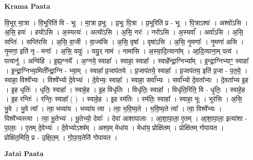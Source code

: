 \documentclass[17pt]{extarticle}
\begin{document}
\textbf{Krama Paata} \newline

वि॒भूर् मा॒त्रा । वि॒भूरिति॑ वि - भूः । मा॒त्रा प्र॒भूः । प्र॒भूः पि॒त्रा । प्र॒भूरिति॑ प्र - भूः । पि॒त्राऽश्वः॑ । अश्वो॑ऽसि । अ॒सि॒ हयः॑ । हयो॑ऽसि । अ॒स्यत्यः॑ । अत्यो॑ऽसि । अ॒सि॒ नरः॑ । नरो॑ऽसि । अ॒स्यर्वा᳚ । अर्वा॑ऽसि । अ॒सि॒ सप्तिः॑ । सप्ति॑रसि । अ॒सि॒ वा॒जी । वा॒ज्य॑सि । अ॒सि॒ वृषा᳚ । वृषा॑ऽसि । अ॒सि॒ नृ॒मणाः᳚ । नृ॒मणा॑ असि । नृ॒मणा॒ इति॑ नृ - मनाः᳚ । अ॒सि॒ ययुः॑ । ययु॒र् नाम॑ । नामा॑सि । अ॒स्या॒दि॒त्याना᳚म् । आ॒दि॒त्याना॒म् पत्व॑ । पत्वानु॑ । अन्वि॑हि । इ॒ह्य॒ग्नये᳚ । अ॒ग्नये॒ स्वाहा᳚ । स्वाहा॒ स्वाहा᳚ । स्वाहे᳚न्द्रा॒ग्निभ्या᳚म् । इ॒न्द्रा॒ग्निभ्याꣳ॒॒ स्वाहा᳚ । इ॒न्द्रा॒ग्निभ्या॒मिती᳚न्द्रा॒ग्नि - भ्या॒म् । स्वाहा᳚ प्र॒जाप॑तये । प्र॒जाप॑तये॒ स्वाहा᳚ । प्र॒जाप॑तय॒ इति॑ प्र॒जा - प॒त॒ये॒ । स्वाहा॒ विश्वे᳚भ्यः । विश्वे᳚भ्यो दे॒वेभ्यः॑ । दे॒वेभ्यः॒ स्वाहा᳚ । स्वाहा॒ सर्वा᳚भ्यः । सर्वा᳚भ्यो दे॒वता᳚भ्यः । दे॒वता᳚भ्य इ॒ह । इ॒ह धृतिः॑ । धृतिः॒ स्वाहा᳚ । स्वाहे॒ह । इ॒ह विधृ॑तिः । विधृ॑तिः॒ स्वाहा᳚ । विधृ॑ति॒रिति॒ वि - धृ॒तिः॒ । स्वाहे॒ह । इ॒ह रन्तिः॑ । रन्तिः॒ स्वाहा᳚ ( ) । स्वाहे॒ह । इ॒ह रम॑तिः । रम॑तिः॒ स्वाहा᳚ । स्वाहा॒ भूः । भूर॑सि । अ॒सि॒ भु॒वे । भु॒वे त्वा᳚ । त्वा॒ भव्या॑य । भव्या॑य त्वा । त्वा॒ भ॒वि॒ष्य॒ते । भ॒वि॒ष्य॒ते त्वा᳚ । त्वा॒ विश्वे᳚भ्यः । विश्वे᳚भ्यस्त्वा । त्वा॒ भू॒तेभ्यः॑ । भू॒तेभ्यो॒ देवाः᳚ । देवा॑ आशापालाः । आ॒शा॒पा॒ला॒ ए॒तम् । आ॒शा॒पा॒ला॒ इत्या॑शा - पा॒लाः॒ । ए॒तम् दे॒वेभ्यः॑ । दे॒वेभ्योऽश्व᳚म् । अश्व॒म् मेधा॑य । मेधा॑य॒ प्रोक्षि॑तम् । प्रोक्षि॑तम् गोपायत । प्रोक्षि॑त॒मिति॒ प्र - उ॒क्षि॒त॒म् । गो॒पा॒य॒तेति॑ गोपायत । \newline

\textbf{Jatai Paata} \newline
\end{document}
